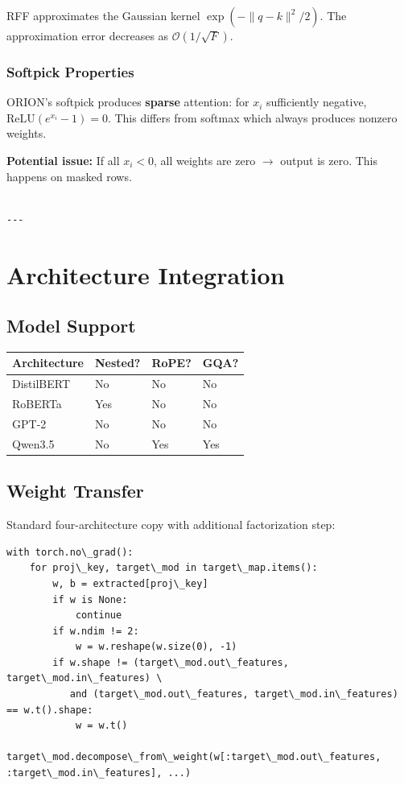 RFF approximates the Gaussian kernel $\exp(-\|q - k\|^2 / 2)$. The 
approximation error decreases as $\mathcal{O}(1/\sqrt{F})$.

\subsubsection{Softpick Properties}

ORION's softpick produces \textbf{sparse} attention: for $x_i$ sufficiently 
negative, $\text{ReLU}(e^{x_i} - 1) = 0$. This differs from softmax which 
always produces nonzero weights.

\textbf{Potential issue:} If all $x_i < 0$, all weights are zero $\to$ output is 
zero. This happens on masked rows.
\begin{lstlisting}

---
\end{lstlisting}


\section{Architecture Integration}

\subsection{Model Support}

\begin{table}[H]
\centering
\small
\begin{tabular}{llll}
\toprule
\textbf{Architecture} & \textbf{Nested?} & \textbf{RoPE?} & \textbf{GQA?} \\
\midrule
DistilBERT & No & No & No \\
RoBERTa & Yes & No & No \\
GPT-2 & No & No & No \\
Qwen3.5 & No & Yes & Yes \\
\bottomrule
\end{tabular}
\end{table}

\subsection{Weight Transfer}

Standard four-architecture copy with additional factorization step:

\begin{lstlisting}
with torch.no\_grad():
    for proj\_key, target\_mod in target\_map.items():
        w, b = extracted[proj\_key]
        if w is None:
            continue
        if w.ndim != 2:
            w = w.reshape(w.size(0), -1)
        if w.shape != (target\_mod.out\_features, target\_mod.in\_features) \
           and (target\_mod.out\_features, target\_mod.in\_features) == w.t().shape:
            w = w.t()
        target\_mod.decompose\_from\_weight(w[:target\_mod.out\_features, :target\_mod.in\_features], ...)
\end{lstlisting}

